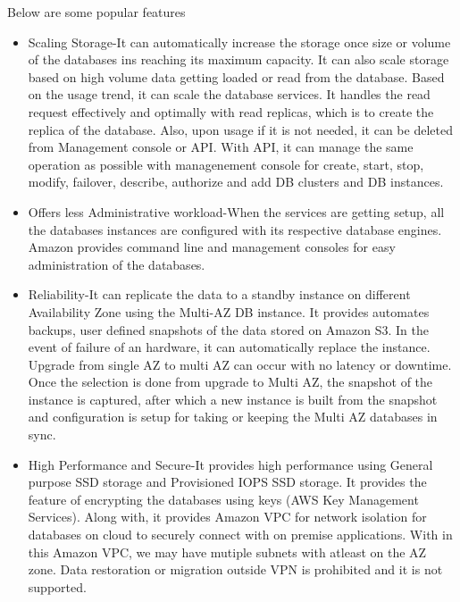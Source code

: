 Below are some popular features 
\begin{itemize}
	
\item Scaling Storage-It can automatically increase the storage once 
size or volume of the databases ins reaching its maximum capacity. It 
can also 
scale storage based on high volume data getting loaded or read 
from the database. Based on the usage trend, it can scale the database 
services. It handles the read request effectively and optimally with read 
replicas, which is to create the replica of the database. 
Also, upon usage if it is not needed, it can be deleted from Management 
console or API. With API, it can manage the same operation as possible 
with managenement console for create, start, stop, modify, failover, 
describe, authorize and add DB clusters and DB instances.

\item Offers less Administrative workload-When the services are getting 
setup, all the databases instances are configured with its respective 
database engines. Amazon provides command line and management consoles for 
easy administration of the databases.

\item Reliability-It can replicate the data to a standby instance on 
different Availability Zone using the Multi-AZ DB instance. It provides  
automates backups, user defined snapshots of the data stored 
on Amazon S3. 
In the event of failure of an hardware, it can automatically replace the 
instance. Upgrade from single AZ to multi AZ can occur with no latency or 
downtime. Once the selection is done from upgrade to Multi AZ, the snapshot 
of the instance is captured, after which a new instance is built from the 
snapshot and configuration is setup for taking or keeping the 
Multi AZ databases in sync.
~\cite{hid-sp18-520-amazonrdsfaqs}

\item High Performance and Secure-It provides high performance using General 
purpose SSD storage and Provisioned IOPS SSD storage. It provides the feature 
of encrypting the databases using keys (AWS Key Management Services). 
Along with, it provides Amazon VPC for network isolation for databases on 
cloud to securely connect with on premise applications. 
With in this Amazon VPC, we may have mutiple subnets with atleast on 
the AZ zone. Data restoration or migration outside VPN is prohibited and 
it is not supported. 

\end{itemize}

